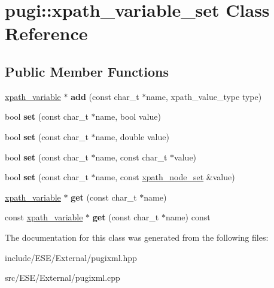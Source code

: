 \hypertarget{classpugi_1_1xpath__variable__set}{\section{pugi\-:\-:xpath\-\_\-variable\-\_\-set Class Reference}
\label{classpugi_1_1xpath__variable__set}
}
\subsection*{Public Member Functions}
\begin{DoxyCompactItemize}
\item 
\hypertarget{classpugi_1_1xpath__variable__set_a07051524f1c6a54bf8f16c9506d6ed5e}{\hyperlink{classpugi_1_1xpath__variable}{xpath\-\_\-variable} $\ast$ {\bfseries add} (const char\-\_\-t $\ast$name, xpath\-\_\-value\-\_\-type type)}\label{classpugi_1_1xpath__variable__set_a07051524f1c6a54bf8f16c9506d6ed5e}

\item 
\hypertarget{classpugi_1_1xpath__variable__set_a461660115640e623fe53af3d9f6b7a05}{bool {\bfseries set} (const char\-\_\-t $\ast$name, bool value)}\label{classpugi_1_1xpath__variable__set_a461660115640e623fe53af3d9f6b7a05}

\item 
\hypertarget{classpugi_1_1xpath__variable__set_a74c45684cc9b790601830f5c51bb8b89}{bool {\bfseries set} (const char\-\_\-t $\ast$name, double value)}\label{classpugi_1_1xpath__variable__set_a74c45684cc9b790601830f5c51bb8b89}

\item 
\hypertarget{classpugi_1_1xpath__variable__set_a6c97731437c5aa4d57b72185ee03451c}{bool {\bfseries set} (const char\-\_\-t $\ast$name, const char\-\_\-t $\ast$value)}\label{classpugi_1_1xpath__variable__set_a6c97731437c5aa4d57b72185ee03451c}

\item 
\hypertarget{classpugi_1_1xpath__variable__set_a5835902a2662631836cc6457709b84ec}{bool {\bfseries set} (const char\-\_\-t $\ast$name, const \hyperlink{classpugi_1_1xpath__node__set}{xpath\-\_\-node\-\_\-set} \&value)}\label{classpugi_1_1xpath__variable__set_a5835902a2662631836cc6457709b84ec}

\item 
\hypertarget{classpugi_1_1xpath__variable__set_aca5af5d65cdf0f639890cc1d3caec610}{\hyperlink{classpugi_1_1xpath__variable}{xpath\-\_\-variable} $\ast$ {\bfseries get} (const char\-\_\-t $\ast$name)}\label{classpugi_1_1xpath__variable__set_aca5af5d65cdf0f639890cc1d3caec610}

\item 
\hypertarget{classpugi_1_1xpath__variable__set_a6a15d76060162ae19f7c175af0c15cc3}{const \hyperlink{classpugi_1_1xpath__variable}{xpath\-\_\-variable} $\ast$ {\bfseries get} (const char\-\_\-t $\ast$name) const }\label{classpugi_1_1xpath__variable__set_a6a15d76060162ae19f7c175af0c15cc3}

\end{DoxyCompactItemize}


The documentation for this class was generated from the following files\-:\begin{DoxyCompactItemize}
\item 
include/\-E\-S\-E/\-External/pugixml.\-hpp\item 
src/\-E\-S\-E/\-External/pugixml.\-cpp\end{DoxyCompactItemize}
